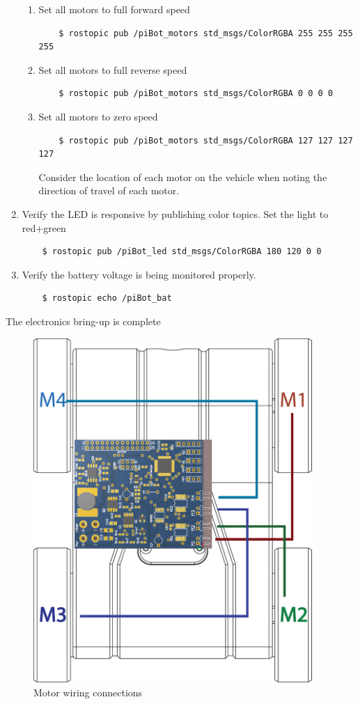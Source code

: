 \documentclass[12pt,titlepage,oneside]{memoir}
\begin{document}
\begin{enumerate}
\begin{enumerate}
	\item Set all motors to full forward speed
	\begin{verbatim}
	$ rostopic pub /piBot_motors std_msgs/ColorRGBA 255 255 255 255
	\end{verbatim}
	\item Set all motors to full reverse speed
	\begin{verbatim}
	$ rostopic pub /piBot_motors std_msgs/ColorRGBA 0 0 0 0
	\end{verbatim}
	\item Set all motors to zero speed
	\begin{verbatim}
	$ rostopic pub /piBot_motors std_msgs/ColorRGBA 127 127 127 127
	\end{verbatim}
	Consider the location of each motor on the vehicle when noting the direction of travel of each
 motor.
 	\end{enumerate}
 	\item Verify the LED is responsive by publishing color topics. Set the light to red+green
 	\begin{verbatim}
 	$ rostopic pub /piBot_led std_msgs/ColorRGBA 180 120 0 0
 	\end{verbatim}
 	\item Verify the battery voltage is being monitored properly.
 	\begin{verbatim}
 	$ rostopic echo /piBot_bat
 	\end{verbatim}
\end{enumerate}
The electronics bring-up is complete

\begin{figure}
\includegraphics[width=400px]{diagram/motorconn.pdf}
\caption{Motor wiring connections}
\label{figure:motorconn}
\end{figure}
\end{document}
